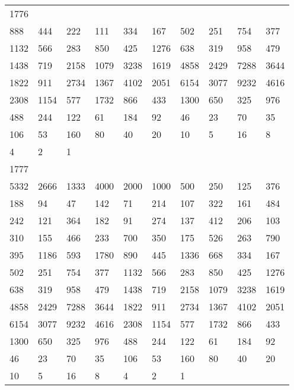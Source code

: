 \begin{longtable}{*{10}{l}}
1776&&&&&&&&&\\
888& 444& 222& 111& 334& 167& 502& 251& 754& 377\\
1132& 566& 283& 850& 425& 1276& 638& 319& 958& 479\\
1438& 719& 2158& 1079& 3238& 1619& 4858& 2429& 7288& 3644\\
1822& 911& 2734& 1367& 4102& 2051& 6154& 3077& 9232& 4616\\
2308& 1154& 577& 1732& 866& 433& 1300& 650& 325& 976\\
488& 244& 122& 61& 184& 92& 46& 23& 70& 35\\
106& 53& 160& 80& 40& 20& 10& 5& 16& 8\\
4& 2& 1& \\

1777&&&&&&&&&\\
5332& 2666& 1333& 4000& 2000& 1000& 500& 250& 125& 376\\
188& 94& 47& 142& 71& 214& 107& 322& 161& 484\\
242& 121& 364& 182& 91& 274& 137& 412& 206& 103\\
310& 155& 466& 233& 700& 350& 175& 526& 263& 790\\
395& 1186& 593& 1780& 890& 445& 1336& 668& 334& 167\\
502& 251& 754& 377& 1132& 566& 283& 850& 425& 1276\\
638& 319& 958& 479& 1438& 719& 2158& 1079& 3238& 1619\\
4858& 2429& 7288& 3644& 1822& 911& 2734& 1367& 4102& 2051\\
6154& 3077& 9232& 4616& 2308& 1154& 577& 1732& 866& 433\\
1300& 650& 325& 976& 488& 244& 122& 61& 184& 92\\
46& 23& 70& 35& 106& 53& 160& 80& 40& 20\\
10& 5& 16& 8& 4& 2& 1& \\


\end{longtable}
